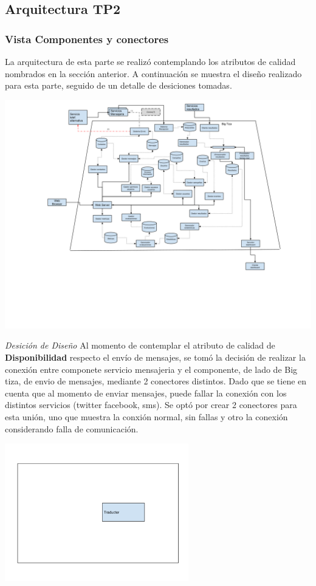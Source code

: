 \documentclass[a4paper, 11pt]{article}
\begin{document}
\subsection{Arquitectura TP2}
\subsubsection{Vista Componentes y conectores}
La arquitectura de esta parte se realizó contemplando los atributos de calidad nombrados en la sección anterior. A continuación se muestra el diseño realizado para esta parte, seguido de un detalle de desiciones tomadas.
\begin{flushleft}
\includegraphics[width=1.3\textwidth]{./diagramas/VistaCompyCon.png}
\end{flushleft}
\emph{Desición de Diseño} Al momento de contemplar el atributo de calidad de \textbf{Disponibilidad} respecto el envío de mensajes, se tomó la decisión de realizar la conexión entre componete servicio mensajeria  y el componente, de lado de Big tiza, de envio de mensajes, mediante 2 conectores distintos. Dado que se tiene en cuenta que al momento  de enviar mensajes, puede fallar la conexión con los distintos servicios (twitter facebook, sms). 
Se optó por crear 2 conectores para esta unión, uno que muestra la conxión normal, sin fallas y otro la conexión considerando falla de comunicación.\\

\centerline{\includegraphics[width=0.6\textwidth]{./diagramas/conector_normal.png}}
\end{document}
